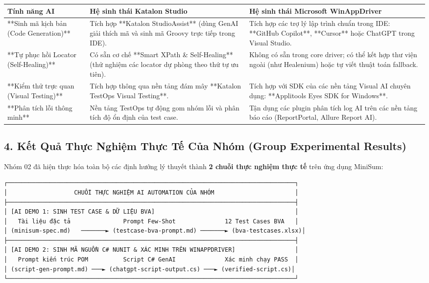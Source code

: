 \begin{table}[H]
\centering
\begin{tabular}{|l|l|l|}
\hline
\textbf{Tính năng AI} & \textbf{Hệ sinh thái Katalon Studio} & \textbf{Hệ sinh thái Microsoft WinAppDriver} \\ \hline
**Sinh mã kịch bản (Code Generation)** & Tích hợp **Katalon StudioAssist** (dùng GenAI giải thích mã và sinh mã Groovy trực tiếp trong IDE). & Tích hợp các trợ lý lập trình chuẩn trong IDE: **GitHub Copilot**, **Cursor** hoặc ChatGPT trong Visual Studio. \\ \hline
**Tự phục hồi Locator (Self-Healing)** & Có sẵn cơ chế **Smart XPath \& Self-Healing** (thử nghiệm các locator dự phòng theo thứ tự ưu tiên). & Không có sẵn trong core driver; có thể kết hợp thư viện ngoài (như Healenium) hoặc tự viết thuật toán fallback. \\ \hline
**Kiểm thử trực quan (Visual Testing)** & Tích hợp thông qua nền tảng đám mây **Katalon TestOps Visual Testing**. & Tích hợp với SDK của các nền tảng Visual AI chuyên dụng: **Applitools Eyes SDK for Windows**. \\ \hline
**Phân tích lỗi thông minh** & Nền tảng TestOps tự động gom nhóm lỗi và phân tích độ ổn định của test case. & Tận dụng các plugin phân tích log AI trên các nền tảng báo cáo (ReportPortal, Allure Report AI). \\ \hline
\end{tabular}
\end{table}






\subsection{4. Kết Quả Thực Nghiệm Thực Tế Của Nhóm (Group Experimental Results)}

Nhóm 02 đã hiện thực hóa toàn bộ các định hướng lý thuyết thành \textbf{2 chuỗi thực nghiệm thực tế} trên ứng dụng MiniSum:

\begin{lstlisting}
┌──────────────────────────────────────────────────────────────────────────────────┐
│                   CHUỖI THỰC NGHIỆM AI AUTOMATION CỦA NHÓM                       │
├──────────────────────────────────────────────────────────────────────────────────┤
│ [AI DEMO 1: SINH TEST CASE & DỮ LIỆU BVA]                                        │
│   Tài liệu đặc tả               Prompt Few-Shot              12 Test Cases BVA   │
│ (minisum-spec.md)   ───────► (testcase-bva-prompt.md) ───────► (bva-testcases.xlsx)│
├──────────────────────────────────────────────────────────────────────────────────┤
│ [AI DEMO 2: SINH MÃ NGUỒN C# NUNIT & XÁC MINH TRÊN WINAPPDRIVER]                 │
│   Prompt kiến trúc POM          Script C# GenAI              Xác minh chạy PASS  │
│ (script-gen-prompt.md) ───► (chatgpt-script-output.cs) ───► (verified-script.cs)│
└──────────────────────────────────────────────────────────────────────────────────┘
\end{lstlisting}


